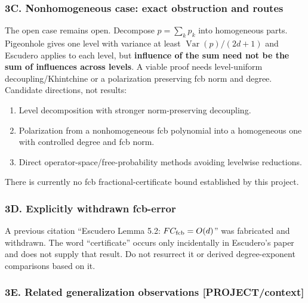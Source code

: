 \subsubsection{3C. Nonhomogeneous case: exact obstruction and routes}\label{c.-nonhomogeneous-case-exact-obstruction-and-routes}

The open case remains open. Decompose \(p=\sum_kp_k\) into homogeneous parts. Pigeonhole gives one level with variance at least \(\operatorname{Var}(p)/(2d+1)\) and Escudero applies to each level, but \textbf{influence of the sum need not be the sum of influences across levels}. A viable proof needs level-uniform decoupling/Khintchine or a polarization preserving fcb norm and degree. Candidate directions, not results:

\begin{enumerate}
\def\labelenumi{\arabic{enumi}.}
\tightlist
\item
  Level decomposition with stronger norm-preserving decoupling.
\item
  Polarization from a nonhomogeneous fcb polynomial into a homogeneous one with controlled degree and fcb norm.
\item
  Direct operator-space/free-probability methods avoiding levelwise reductions.
\end{enumerate}

There is currently no fcb fractional-certificate bound established by this project.

\subsubsection{3D. Explicitly withdrawn fcb-error}\label{d.-explicitly-withdrawn-fcb-error}

A previous citation ``Escudero Lemma 5.2: \(FC_{\rm fcb}=O(d)\)'' was fabricated and withdrawn. The word ``certificate'' occurs only incidentally in Escudero's paper and does not supply that result. Do not resurrect it or derived degree-exponent comparisons based on it.

\subsubsection{3E. Related generalization observations {[}PROJECT/context{]}}\label{e.-related-generalization-observations-projectcontext}


